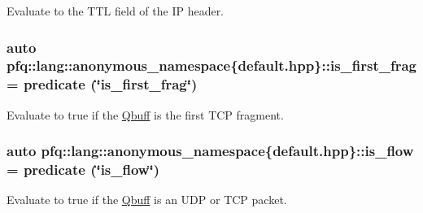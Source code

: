 Evaluate to the {\ttfamily T\+TL} field of the IP header. 

\subsubsection[{\texorpdfstring{is\+\_\+first\+\_\+frag}{is_first_frag}}]{\setlength{\rightskip}{0pt plus 5cm}auto pfq\+::lang\+::anonymous\+\_\+namespace\{default.\+hpp\}\+::is\+\_\+first\+\_\+frag = {\bf predicate} (\char`\"{}is\+\_\+first\+\_\+frag\char`\"{})}\hypertarget{namespacepfq_1_1lang_1_1anonymous__namespace_02default_8hpp_03_afb797cc442d04e614a9ac68c7c4c35ff}{}\label{namespacepfq_1_1lang_1_1anonymous__namespace_02default_8hpp_03_afb797cc442d04e614a9ac68c7c4c35ff}


Evaluate to {\ttfamily true} if the \hyperlink{structpfq_1_1lang_1_1Qbuff}{Qbuff} is the first T\+CP fragment. 

\subsubsection[{\texorpdfstring{is\+\_\+flow}{is_flow}}]{\setlength{\rightskip}{0pt plus 5cm}auto pfq\+::lang\+::anonymous\+\_\+namespace\{default.\+hpp\}\+::is\+\_\+flow = {\bf predicate} (\char`\"{}is\+\_\+flow\char`\"{})}\hypertarget{namespacepfq_1_1lang_1_1anonymous__namespace_02default_8hpp_03_ae52890434121a999589d48bccae3c3e2}{}\label{namespacepfq_1_1lang_1_1anonymous__namespace_02default_8hpp_03_ae52890434121a999589d48bccae3c3e2}


Evaluate to {\ttfamily true} if the \hyperlink{structpfq_1_1lang_1_1Qbuff}{Qbuff} is an U\+DP or T\+CP packet. 

